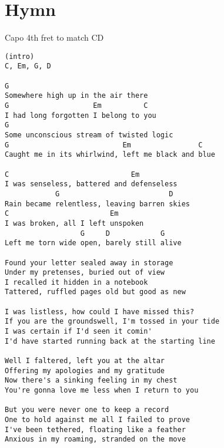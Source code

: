 \documentclass[leqno]{memoir}
\begin{document}
\chapter{Hymn}
Capo 4th fret to match CD
\begin{verbatim}
(intro)
C, Em, G, D

G
Somewhere high up in the air there
G                    Em          C
I had long forgotten I belong to you
G   
Some unconscious stream of twisted logic
G                           Em                C
Caught me in its whirlwind, left me black and blue

C                             Em
I was senseless, battered and defenseless
            G                          D
Rain became relentless, leaving barren skies
C                        Em
I was broken, all I left unspoken
                  G     D            G
Left me torn wide open, barely still alive

Found your letter sealed away in storage
Under my pretenses, buried out of view
I recalled it hidden in a notebook
Tattered, ruffled pages old but good as new

I was listless, how could I have missed this?
If you are the groundswell, I'm tossed in your tide
I was certain if I'd seen it comin'
I'd have started running back at the starting line

Well I faltered, left you at the altar
Offering my apologies and my gratitude
Now there's a sinking feeling in my chest
You're gonna love me less when I return to you

But you were never one to keep a record
One to hold against me all I failed to prove
I've been tethered, floating like a feather
Anxious in my roaming, stranded on the move
\end{verbatim}
\newpage
\end{document}
